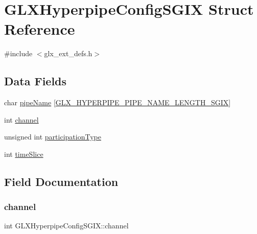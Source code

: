 \hypertarget{struct_g_l_x_hyperpipe_config_s_g_i_x}{}\section{G\+L\+X\+Hyperpipe\+Config\+S\+G\+IX Struct Reference}
\label{struct_g_l_x_hyperpipe_config_s_g_i_x}


{\ttfamily \#include $<$glx\+\_\+ext\+\_\+defs.\+h$>$}

\subsection*{Data Fields}
\begin{DoxyCompactItemize}
\item 
char \hyperlink{struct_g_l_x_hyperpipe_config_s_g_i_x_a9e3748f92005cac81cb44d4c67acccb8}{pipe\+Name} \mbox{[}\hyperlink{glx__ext__defs_8h_ae1c8261c0861010d8003a31d07e26005}{G\+L\+X\+\_\+\+H\+Y\+P\+E\+R\+P\+I\+P\+E\+\_\+\+P\+I\+P\+E\+\_\+\+N\+A\+M\+E\+\_\+\+L\+E\+N\+G\+T\+H\+\_\+\+S\+G\+IX}\mbox{]}
\item 
int \hyperlink{struct_g_l_x_hyperpipe_config_s_g_i_x_abc812d8796ba89d5de4e33b3532d8335}{channel}
\item 
unsigned int \hyperlink{struct_g_l_x_hyperpipe_config_s_g_i_x_a093cfaaec305531f66e1120929b5b01b}{participation\+Type}
\item 
int \hyperlink{struct_g_l_x_hyperpipe_config_s_g_i_x_afe9288e75dc1ae5e0f33eff978d7024d}{time\+Slice}
\end{DoxyCompactItemize}


\subsection{Field Documentation}
\mbox{\label{struct_g_l_x_hyperpipe_config_s_g_i_x_abc812d8796ba89d5de4e33b3532d8335}} 
\subsubsection{\texorpdfstring{channel}{channel}}
{\footnotesize\ttfamily int G\+L\+X\+Hyperpipe\+Config\+S\+G\+I\+X\+::channel}


